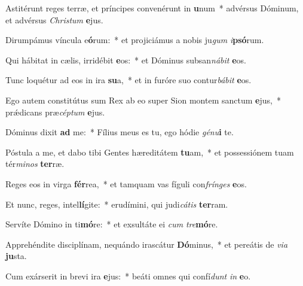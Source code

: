 \item Astitérunt reges terræ, et príncipes convenérunt in \textbf{u}num~* advérsus Dóminum, et advérsus \textit{Christum} \textbf{e}jus.
\item Dirumpámus víncula e\textbf{ó}rum:~* et projiciámus a nobis ju\textit{gum} \textit{i}\textbf{psó}rum. %
\item Qui hábitat in cælis, irridébit \textbf{e}os:~* et Dóminus subsan\textit{nábit} \textbf{e}os.
\item Tunc loquétur ad eos in ira \textbf{su}a,~* et in furóre suo contur\textit{bábit} \textbf{e}os.
\item Ego autem constitútus sum Rex ab eo super Sion montem sanctum \textbf{e}jus,~* prǽdicans præ\textit{céptum} \textbf{e}jus.
\item Dóminus dixit \textbf{ad} me:~* Fílius meus es tu, ego hódie \textit{génu}\textbf{i} te.
\item Póstula a me, et dabo tibi Gentes hæreditátem \textbf{tu}am,~* et possessiónem tuam tér\textit{minos} \textbf{ter}ræ.
\item Reges eos in virga \textbf{fér}rea,~* et tamquam vas fíguli con\textit{frínges} \textbf{e}os.
\item Et nunc, reges, intel\textbf{lí}gite:~* erudímini, qui judi\textit{cátis} \textbf{ter}ram.
\item Servíte Dómino in ti\textbf{mó}re:~* et exsultáte ei \textit{cum} \textit{tre}\textbf{mó}re.
\item Apprehéndite disciplínam, nequándo irascátur \textbf{Dó}minus,~* et pereátis de \textit{via} \textbf{ju}sta.
\item Cum exárserit in brevi ira \textbf{e}jus:~* beáti omnes qui confí\textit{dunt} \textit{in} \textbf{e}o.
